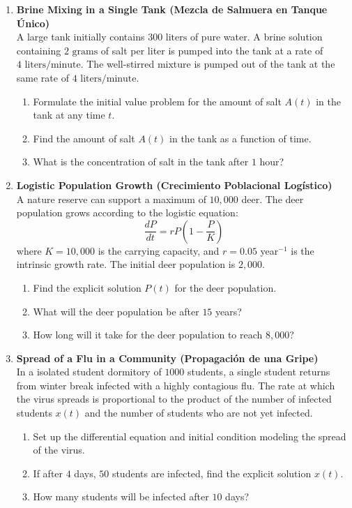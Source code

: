 \documentclass[11pt,letterpaper]{article}
\begin{document}
\begin{enumerate}[label=\textbf{Problem \arabic*:}, leftmargin=*]
    \item \textbf{Brine Mixing in a Single Tank (Mezcla de Salmuera en Tanque Único)} \\
    A large tank initially contains $300\text{ liters}$ of pure water. A brine solution containing $2\text{ grams}$ of salt per liter is pumped into the tank at a rate of $4\text{ liters/minute}$. The well-stirred mixture is pumped out of the tank at the same rate of $4\text{ liters/minute}$.
    \begin{enumerate}[label=(\alph*)]
        \item Formulate the initial value problem for the amount of salt $A(t)$ in the tank at any time $t$.
        \item Find the amount of salt $A(t)$ in the tank as a function of time.
        \item What is the concentration of salt in the tank after $1$ hour?
    \end{enumerate}

    \item \textbf{Logistic Population Growth (Crecimiento Poblacional Logístico)} \\
    A nature reserve can support a maximum of $10,000$ deer. The deer population grows according to the logistic equation:
    \[ \frac{dP}{dt} = r P \left(1 - \frac{P}{K}\right) \]
    where $K = 10,000$ is the carrying capacity, and $r = 0.05$ year$^{-1}$ is the intrinsic growth rate. The initial deer population is $2,000$.
    \begin{enumerate}[label=(\alph*)]
        \item Find the explicit solution $P(t)$ for the deer population.
        \item What will the deer population be after $15$ years?
        \item How long will it take for the deer population to reach $8,000$?
    \end{enumerate}

    \item \textbf{Spread of a Flu in a Community (Propagación de una Gripe)} \\
    In a isolated student dormitory of $1000$ students, a single student returns from winter break infected with a highly contagious flu. The rate at which the virus spreads is proportional to the product of the number of infected students $x(t)$ and the number of students who are not yet infected.
    \begin{enumerate}[label=(\alph*)]
        \item Set up the differential equation and initial condition modeling the spread of the virus.
        \item If after $4$ days, $50$ students are infected, find the explicit solution $x(t)$.
        \item How many students will be infected after $10$ days?
    \end{enumerate}


\end{enumerate}
\end{document}
